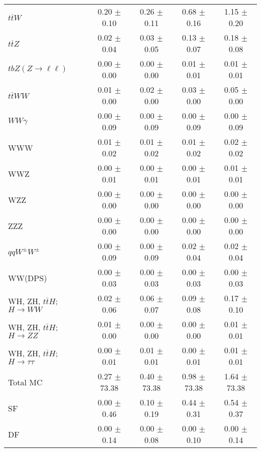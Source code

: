 \begin{tabular}{l|cccc}
                   $t\overline{t}W$ &  0.20 $\pm$  0.10 &  0.26 $\pm$  0.11 &  0.68 $\pm$  0.16 &  1.15 $\pm$  0.20 \\
                   $t\overline{t}Z$ &  0.02 $\pm$  0.04 &  0.03 $\pm$  0.05 &  0.13 $\pm$  0.07 &  0.18 $\pm$  0.08 \\
    $tbZ (Z \rightarrow \ell \ell)$ &  0.00 $\pm$  0.00 &  0.00 $\pm$  0.00 &  0.01 $\pm$  0.01 &  0.01 $\pm$  0.01 \\
                  $t\overline{t}WW$ &  0.01 $\pm$  0.00 &  0.02 $\pm$  0.00 &  0.03 $\pm$  0.00 &  0.05 $\pm$  0.00 \\
                         $WW\gamma$ &  0.00 $\pm$  0.09 &  0.00 $\pm$  0.09 &  0.00 $\pm$  0.09 &  0.00 $\pm$  0.09 \\
                                WWW &  0.01 $\pm$  0.02 &  0.01 $\pm$  0.02 &  0.01 $\pm$  0.02 &  0.02 $\pm$  0.02 \\
                                WWZ &  0.00 $\pm$  0.01 &  0.00 $\pm$  0.01 &  0.00 $\pm$  0.01 &  0.01 $\pm$  0.01 \\
                                WZZ &  0.00 $\pm$  0.00 &  0.00 $\pm$  0.00 &  0.00 $\pm$  0.00 &  0.00 $\pm$  0.00 \\
                                ZZZ &  0.00 $\pm$  0.00 &  0.00 $\pm$  0.00 &  0.00 $\pm$  0.00 &  0.00 $\pm$  0.00 \\
                 $qqW^{\pm}W^{\pm}$ &  0.00 $\pm$  0.09 &  0.00 $\pm$  0.09 &  0.02 $\pm$  0.04 &  0.02 $\pm$  0.04 \\
                            WW(DPS) &  0.00 $\pm$  0.03 &  0.00 $\pm$  0.03 &  0.00 $\pm$  0.03 &  0.00 $\pm$  0.03 \\
WH, ZH, $t\bar{t}H$; $H \rightarrow WW$ &  0.02 $\pm$  0.06 &  0.06 $\pm$  0.07 &  0.09 $\pm$  0.08 &  0.17 $\pm$  0.10 \\
WH, ZH, $t\bar{t}H$; $H \rightarrow ZZ$ &  0.01 $\pm$  0.00 &  0.00 $\pm$  0.00 &  0.00 $\pm$  0.00 &  0.01 $\pm$  0.01 \\
WH, ZH, $t\bar{t}H$; $H \rightarrow \tau\tau$ &  0.00 $\pm$  0.01 &  0.01 $\pm$  0.01 &  0.00 $\pm$  0.01 &  0.01 $\pm$  0.01 \\
\hline\hline
                           Total MC &  0.27 $\pm$ 73.38 &  0.40 $\pm$ 73.38 &  0.98 $\pm$ 73.38 &  1.64 $\pm$ 73.38 \\
\hline
                                 SF &  0.00 $\pm$  0.46 &  0.10 $\pm$  0.19 &  0.44 $\pm$  0.31 &  0.54 $\pm$  0.37 \\
                                 DF &  0.00 $\pm$  0.14 &  0.00 $\pm$  0.08 &  0.00 $\pm$  0.10 &  0.00 $\pm$  0.14 \\

\end{tabular}
